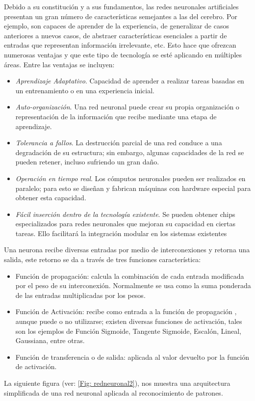 Debido a su constitución y a sus fundamentos, las redes neuronales artificiales presentan un gran número de características semejantes a las del cerebro. Por ejemplo, son capaces de aprender de la experiencia, de generalizar de casos anteriores a nuevos casos, de abstraer características esenciales a partir de entradas que representan información irrelevante, etc. Esto hace que ofrezcan numerosas ventajas y que este tipo de tecnología se esté aplicando en múltiples áreas. Entre las ventajas se incluyen:
\begin{itemize}
\item \textit{Aprendizaje Adaptativo}. Capacidad de aprender a realizar tareas basadas en un entrenamiento o en una experiencia inicial.
\item \textit{Auto-organización}. Una red neuronal puede crear su propia organización o representación de la información que recibe mediante una etapa de aprendizaje.
\item \textit{Tolerancia a fallos}. La destrucción parcial de una red conduce a una degradación de su estructura; sin embargo, algunas capacidades de la red se pueden retener, incluso sufriendo un gran daño.
\item \textit{Operación en tiempo real}. Los cómputos neuronales pueden ser realizados en paralelo; para esto se diseñan y fabrican máquinas con hardware especial para obtener esta capacidad.
\item \textit{Fácil inserción dentro de la tecnología existente}. Se pueden obtener chips especializados para redes neuronales que mejoran su capacidad en ciertas tareas. Ello facilitará la integración modular en los sistemas existentes
\end{itemize}

Una neurona recibe diversas entradas por medio de interconexiones y retorna una salida, este retorno se da a través de tres funciones característica:
\begin{itemize}
\item Función de propagación: calcula la combinación de cada entrada modificada por el peso de su interconexión. Normalmente se usa como la suma ponderada de las entradas multiplicadas por los pesos.
\item Función de Activación: recibe como entrada a la función de propagación , aunque puede o no utilizarse; existen diversas funciones de activación, tales son los ejemplos de Función Sigmoide, Tangente Sigmoide, Escalón, Lineal, Gaussiana, entre otras.
\item Función de transferencia o  de salida: aplicada al valor devuelto por la función de activación.
\end{itemize}
La siguiente figura (ver: \ref{Fig: redneuronal2}), nos muestra una arquitectura simplificada de una red neuronal aplicada al reconocimiento de patrones.

